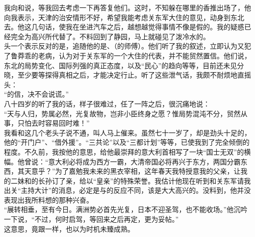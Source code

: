 我向和说，等我回去考虑一下再答复他们。这时，不知躲在哪里的香推出场了，他向我表示，天津的治安情形不好，希望我能考虑关东军大住的意见，动身到东北去。他这几句话，使我在坐进汽车之后，越想越觉得事情不像是假的。我的疑惑已经完全为高兴所代替了。不料回到了静园，马上就碰见了泼冷水的。\\

头一个表示反对的是，追随他的是、（的师傅）。他们听了我的叙述，立即认为又犯了鲁莽乖的老病，认为对于关东军的一个大住的代表，并不能贸然置信。他们说，东北的局势变化、国际列强的真正态度，以及“民心”的趋向等等，目前还未见分晓，至少要等探得真相之后，才能决定行止。听了这些泄气话，我颇不耐烦地直摇头：\\

“的信，决不会说谎。”\\

八十四岁的听了我的话，样子很难过，任了一阵之后，很沉痛地说：\\

“天与人归，势属必然，光复故物，岂非小臣终身之愿？惟局势混沌不分，贸然从事，只怕去时容易回时难！”\\

我看和这几个老头子说不通，叫人马上催来。虽然七十一岁了，却是劲头十足的，他的“开门户”、“借外援”。“三共论”以及“三都计划”等等，已使我到了完全倾倒的程度。不久前，我按他的意思，给他最崇拜的意大利首相写了一块“国士无双”的横幅。他曾说：“意大利必将成为西方一霸，大清帝国必将再兴于东方，两国分霸东西，其天意乎？”为了嘉勉我未来的黑衣宰相，这年春天我特授意我的父亲，让我的二妹和的长孙订了亲，给以“皇亲”的特殊荣誉。我估计他现在听到和关东军请我出关“主持大计”的消息，必定是与的反应不同，该是大大高兴的。没料到，他并没表现出我所料想的那种兴奋。\\

“展转相垂，至有今日。满洲势必首先光复，日本不迎圣驾，也不能收场。”他沉吟一下说，“不过，何时启驾，等回来之后再定，更为妥帖。”\\

这意思，竟跟一样，也以为时机未臻成熟。\\

